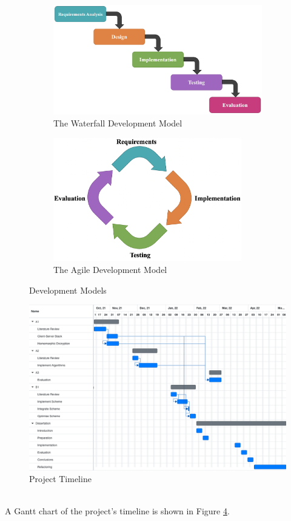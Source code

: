 \begin{figure}[h!]
    \centering
    \begin{subfigure}[b]{0.495\textwidth}
        \centering
        \includegraphics[width=1.1\textwidth]{figures/waterfall.png}
        \caption{The Waterfall Development Model}
        \label{fig:waterfall}
    \end{subfigure}
    \hfill
    \begin{subfigure}[b]{0.495\textwidth}
        \centering
        \includegraphics[width=0.9\textwidth]{figures/agile.png}
        \caption{The Agile Development Model}
        \label{fig:agile}
    \end{subfigure}
    \caption{Development Models}
\end{figure}
\begin{figure}[h!]
    \centering
    \includegraphics[width=\textwidth]{figures/gantt.png}
    \caption{Project Timeline}
    \label{fig:gantt}
\end{figure}
\smallskip \\ \indent
A Gantt chart of the project's timeline is shown in Figure \ref{fig:gantt}.
